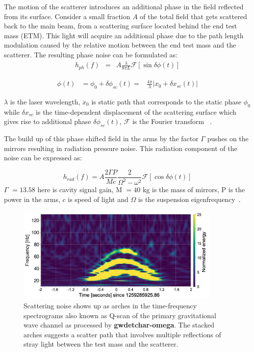 \documentclass[12pt]{iopart}
\begin{document}
The motion of the scatterer introduces an additional phase in the field reflected from its surface. Consider a small fraction $A$ of the total field that gets scattered back to the main beam, from a scattering surface located behind the end test mass (ETM). This light will acquire an additional phase  due to the path length modulation caused by the relative motion between the end test mass and the scatterer. The resulting phase noise can be formulated as:
\begin{eqnarray}
      h_{ph}(f) & = & A\frac{{\lambda}}{8{\pi}L}\mathcal{F}\left[\sin{\delta{\phi}(t)}\right] \label{eq:1}
\end{eqnarray}

\begin{eqnarray}
    {\phi}(t) & = {\phi}_{0} + {\delta\phi_{sc}(t)} = & \frac{4{\pi}}{{\lambda}}\left|{ x_{0} + {\delta} x_{sc}(t)}\right| \label{eq:2}
\end{eqnarray}
    
${\lambda}$ is the laser wavelength, $x_{0}$ is static path that corresponds to the static phase $\phi_{0}$ while  $\delta x_{sc}$ is the time-dependent displacement of the scattering surface which gives rise to additional phase $\delta \phi_{sc}(t)$, 
$\mathcal{F}$ is the Fourier transform ~\cite{Accadia:2010zzb,Canuel:13,vajente_chapter}. 
\par
The build up of this phase shifted field in the arms by the factor ${\Gamma}$ pushes on the mirrors resulting in radiation pressure noise. This radiation component of the noise can be expressed as:


\begin{equation}
    h_{rad}(f) = A\frac{2{\Gamma P}}{Mc}\frac{2}{\Omega^2 - \omega^2} \mathcal{F}\left[\cos{\delta{\phi}(t)}\right] \label{rad_eqn}
\end{equation}
${\Gamma}$ $= 13.58$ here is cavity signal gain, M $= 40$ kg is the mass of mirrors, P is the power in the arms, $c$ is speed of light and ${\Omega}$ is the suspension eigenfrequency~\cite{Ottaway:12}.
\begin{figure}[h]
    \centering
    \includegraphics[width=10cm]{scatindarmlrs1.png}
    \caption{Scattering noise shows up as arches in the time-frequency spectrograms also known as Q-scan of the primary gravitational wave channel as processed by \textbf{gwdetchar-omega}\cite{Chatterji:2004qg,gwdetchar}. The stacked arches suggests a scatter path that involves multiple reflections of stray light between the test mass and the scatterer.}
    \label{fig:scat}
\end{figure}
\end{document}
